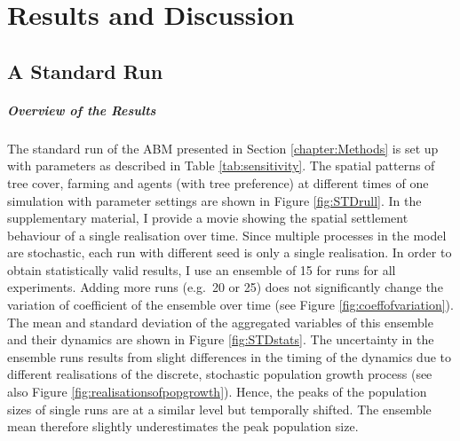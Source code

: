 \chapter{Results and Discussion}\label{chapter:Results}
\FloatBarrier
\section{A Standard Run}
\paragraph{Overview of the Results}
The standard run of the ABM presented in Section \ref{chapter:Methods} 
is set up with parameters as described in Table \ref{tab:sensitivity}.
The spatial patterns of tree cover, farming and agents (with tree preference) at different times of one simulation with parameter settings are shown in Figure \ref{fig:STDrull}.
In the supplementary material, I provide a movie showing the spatial settlement behaviour of a single realisation over time. \TODO
Since multiple processes in the model are stochastic, each run with different seed is only a single realisation.
In order to obtain statistically valid results, I use an ensemble of 15 for runs for all experiments.
Adding more runs (e.g.\ 20 or 25) does not significantly change the variation of coefficient of the ensemble over time (see Figure \ref{fig:coeffofvariation}).
The mean and standard deviation of the aggregated variables of this ensemble and their dynamics are shown in Figure \ref{fig:STDstats}.
The uncertainty in the ensemble runs results from slight differences in the timing of the dynamics due to different realisations of the discrete, stochastic population growth process (see also Figure \ref{fig:realisationsofpopgrowth}). 
Hence, the peaks of the population sizes of single runs are at a similar level but temporally shifted. 
The ensemble mean therefore slightly underestimates the peak population size.

